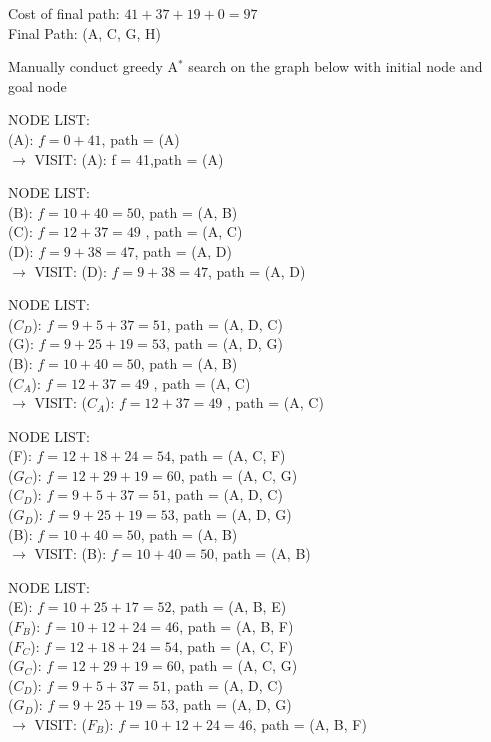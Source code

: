 \documentclass[12pt]{article}
\begin{document}
\noindent
Cost of final path: $41+37+19+0=97$\\
Final Path: (A, C, G, H)

\newpage
\problem Manually conduct greedy A$^*$ search on the graph below with initial node  and goal node 

\noindent
NODE LIST:\\
(A): $f=0+41$, path = (A)\\
$\rightarrow$ VISIT: (A): f = 41,path = (A)

\noindent
NODE LIST:\\
(B): $f=10+40=50$, path = (A, B)\\
(C): $f=12+37=49$ , path = (A, C)\\
(D): $f=9+38=47$, path = (A, D)\\
$\rightarrow$ VISIT: (D): $f=9+38=47$, path = (A, D)

\noindent
NODE LIST:\\
($C_D$): $f=9+5+37=51$, path = (A, D, C)\\
(G): $f=9+25+19=53$, path = (A, D, G)\\
(B): $f=10+40=50$, path = (A, B)\\
($C_A$): $f=12+37=49$ , path = (A, C)\\
$\rightarrow$ VISIT: ($C_A$): $f=12+37=49$ , path = (A, C)

\noindent
NODE LIST:\\
(F): $f=12+18+24=54$, path = (A, C, F)\\
($G_C$): $f=12+29+19=60$, path = (A, C, G)\\
($C_D$): $f=9+5+37=51$, path = (A, D, C)\\
($G_D$): $f=9+25+19=53$, path = (A, D, G)\\
(B): $f=10+40=50$, path = (A, B)\\
$\rightarrow$ VISIT: (B): $f=10+40=50$, path = (A, B)

\noindent
NODE LIST:\\
(E): $f=10+25+17=52$, path = (A, B, E) \\
($F_B$): $f=10+12+24=46$, path = (A, B, F)\\
($F_C$): $f=12+18+24=54$, path = (A, C, F)\\
($G_C$): $f=12+29+19=60$, path = (A, C, G)\\
($C_D$): $f=9+5+37=51$, path = (A, D, C)\\
($G_D$): $f=9+25+19=53$, path = (A, D, G)\\
$\rightarrow$ VISIT: ($F_B$): $f=10+12+24=46$, path = (A, B, F)
\end{document}
